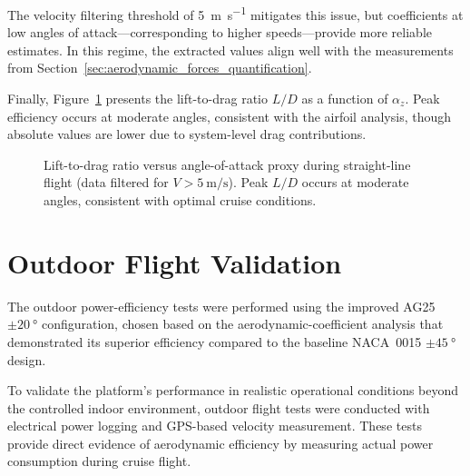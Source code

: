 The velocity filtering threshold of \SI{5}{\meter\per\second} mitigates this issue, but coefficients at low angles of attack—corresponding to higher speeds—provide more reliable estimates.
In this regime, the extracted values align well with the measurements from Section~\ref{sec:aerodynamic_forces_quantification}.

Finally, Figure~\ref{fig:ld_vs_alpha} presents the lift-to-drag ratio $L/D$ as a function of $\alpha_z$.
Peak efficiency occurs at moderate angles, consistent with the airfoil analysis, though absolute values are lower due to system-level drag contributions.

\begin{figure}[htbp]
  \centering
  \caption{Lift-to-drag ratio versus angle-of-attack proxy during straight-line flight (data filtered for $V > \SI{5}{\meter\per\second}$). Peak $L/D$ occurs at moderate angles, consistent with optimal cruise conditions.}
  \label{fig:ld_vs_alpha}
\end{figure}

\section{Outdoor Flight Validation}\label{sec:outdoor-flight}

The outdoor power-efficiency tests were performed using the improved AG25 $\pm\SI{20}{\degree}$ configuration, chosen based on the aerodynamic-coefficient analysis that demonstrated its superior efficiency compared to the baseline NACA~0015 $\pm\SI{45}{\degree}$ design.

To validate the platform's performance in realistic operational conditions beyond the controlled indoor environment, outdoor flight tests were conducted with electrical power logging and GPS-based velocity measurement.
These tests provide direct evidence of aerodynamic efficiency by measuring actual power consumption during cruise flight.

